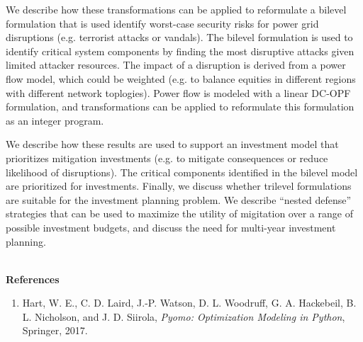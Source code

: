 \documentclass[a4paper,11pt]{article}
\newcommand{\vref}[1]{
\item #1
}
\newcommand{\paperreferences}[1]{%
~\\
\noindent \large \textbf{References}
\renewcommand{\theenumi}{[\arabic{enumi}]}
\renewcommand{\labelenumi}{\theenumi}
\begin{enumerate}
\normalsize
#1
\end{enumerate}
\newpage
}
\begin{document}
We describe how these transformations can be applied to reformulate
a bilevel formulation that is used identify worst-case security
risks for power grid disruptions (e.g. terrorist attacks or vandals).
The bilevel formulation is used to identify critical system components
by finding the most disruptive attacks given limited attacker
resources.  The impact of a disruption is derived from a power flow
model, which could be weighted (e.g. to balance equities in different
regions with different network toplogies).  Power flow is modeled
with a linear DC-OPF formulation, and transformations can be applied to 
reformulate this formulation as an integer program.

We describe how these results are used to support an investment
model that prioritizes mitigation investments (e.g. to mitigate
consequences or reduce likelihood of disruptions).  The critical
components identified in the bilevel model are prioritized for
investments.  Finally, we discuss whether trilevel formulations are
suitable for the investment planning problem.  We describe ``nested
defense'' strategies that can be used to maximize the utility of
migitation over a range of possible investment budgets, and discuss
the need for multi-year investment planning.


\paperreferences{
\vref{\label{PyomoBook17} Hart, W. E., C. D. Laird, J.-P. Watson, D. L. Woodruff, G. A. Hackebeil, B. L. Nicholson, and J. D. Siirola, \emph{Pyomo: Optimization Modeling in Python}, Springer, 2017.}

}
\end{document}
